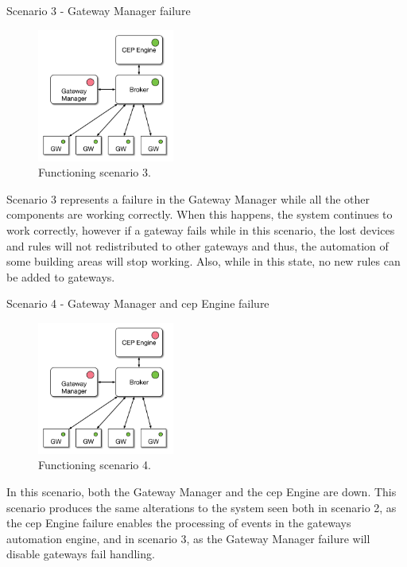 \begin{Paragraph}{Scenario 3 - Gateway Manager failure}
	\begin{figure}[H]
		\centering
		\includegraphics[width=0.4\textwidth]{figures/fs5.png}
		\caption{Functioning scenario 3.}
		\label{fig:fs5}
	\end{figure}

Scenario 3 represents a failure in the Gateway Manager while all the other components are working correctly. When this happens, the system continues to work correctly, however if a gateway fails while in this scenario, the lost devices and rules will not redistributed to other gateways and thus, the automation of some building areas will stop working. Also, while in this state, no new rules can be added to gateways.


\end{Paragraph}



\begin{Paragraph}{Scenario 4 - Gateway Manager and \ac{cep} Engine failure}
\begin{figure}[H]
	\centering
	\includegraphics[width=0.4\textwidth]{figures/fs4.png}
	\caption{Functioning scenario 4.}
	\label{fig:fs4}
\end{figure}

In this scenario, both the Gateway Manager and the \ac{cep} Engine are down. This scenario produces the same alterations to the system seen both in scenario 2, as the \ac{cep} Engine failure enables the processing of events in the gateways automation engine, and in scenario 3, as the Gateway Manager failure will disable gateways fail handling.



\end{Paragraph}



